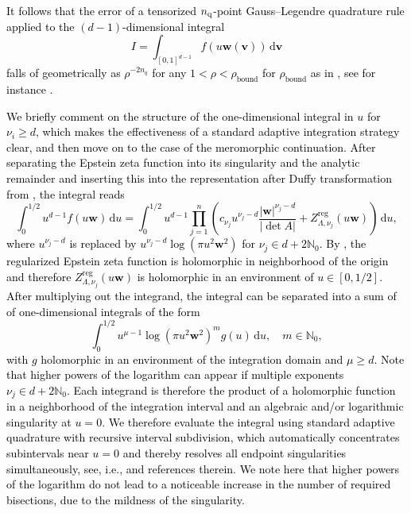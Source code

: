 \documentclass[]{amsart}
\numberwithin{mythm}{section}
\newcommand{\new}[1]{{\textcolor{black}{#1}}}
\begin{document}
\new{
It follows that the error of a tensorized $n_{\rm q}$-point Gauss--Legendre quadrature rule applied to the $(d-1)$-dimensional integral
\[
I=\int_{[0,1]^{d-1}}   f(u \bm w (\bm v))\,\mathrm d \bm v
\]
 falls of geometrically as $\rho^{-2n_{ q}}$
for any $1<\rho<\rho_\mathrm{bound}$ for $\rho_\mathrm{bound}$ as in \Cref{hol-bernstein}, see for instance
\cite[Th. 5.3.15]{sauter2010boundary}.}


\new{We briefly comment on the structure of the one-dimensional integral in $u$ for $\nu_i\ge d$, which makes the effectiveness of a standard adaptive integration strategy clear, and then move on to the case of the meromorphic continuation. After separating the Epstein zeta function into its singularity and the analytic remainder and inserting this into the representation after Duffy transformation from \Cref{duffy}, the integral reads
\[ 
    \int_{0}^{1/2} u^{d-1}  f(u \bm w) \,\mathrm d u =  \int_{0}^{1/2} u^{d-1} \prod_{j=1}^n \left(c_{\nu_j} u^{\nu_j-d} \frac{\vert \bm w \vert^{\nu_j-d}}{\vert \det{A} \vert} + Z^\mathrm{reg}_{\Lambda,\nu_j}(u\bm w) \right)  \,\mathrm d u,
\]
where $u^{\nu_j-d}$ is replaced by $u^{\nu_j-d}\log(\pi u^2\bm w^2)$ for $\nu_j \in d+2\mathds N_0$. By \Cref{holreg}, the regularized Epstein zeta function is holomorphic in neighborhood of the origin and therefore $Z^\mathrm{reg}_{\Lambda,\nu_j}(u\bm w)$ is holomorphic in an environment of $u\in [0,1/2]$. After multiplying out the integrand, the integral can be separated into a sum of of one-dimensional integrals  of the form
\[
\int_{0}^{1/2}u^{\mu-1} \log(\pi u^2\bm w^2)^m g(u)\,\mathrm d u, \quad m\in \mathds N_0,
\]
with $g$ holomorphic in an environment of the integration domain and $\mu\ge d$. Note that higher powers of the logarithm can appear if multiple exponents $\nu_j \in d+2\mathds N_0$.
Each integrand is therefore the product of a holomorphic function in a neighborhood of the integration interval and an algebraic and/or logarithmic singularity at $u=0$. We therefore evaluate the integral using standard adaptive quadrature with recursive interval subdivision, which automatically concentrates subintervals near $u=0$ and thereby resolves all endpoint singularities simultaneously, see, i.e., \cite{piessens2012quadpack} and references therein. We note here that higher powers of the logarithm do not lead to a noticeable increase in the number of required bisections, due to the mildness of the singularity.
}
\end{document}

